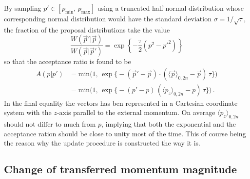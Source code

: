 By sampling $ p' \in [p_\text{min}, \, p_\text{max}] $ using a truncated half-normal distribution whose corresponding normal distribution would have the standard deviation $ \sigma = 1/\sqrt \tau $, the fraction of the proposal distributions take the value
\begin{equation}
	\frac{W(\vec p' | \vec p)}{W(\vec p | \vec p')} = \exp \left\{ - \frac{\tau}{2} (p^2 - p'^2) \right\}
\end{equation}
so that the acceptance ratio is found to be
\begin{equation}
	\begin{split}
		A(p|p')
		&= \text{min} \Big( 1, \, \exp \big\{ - (\vec p' - \vec p) \cdot (\langle \vec p \rangle_{0,2n} - \vec p) \, \tau \big\} \Big) \\
		&= \text{min} \Big( 1, \, \exp \big\{ - (p' - p) \, (\langle p_z \rangle_{0,2n} - p) \, \tau \big\} \Big) \,.
	\end{split}
\end{equation}
In the final equality the vectors has ben represented in a Cartesian coordinate system with the $ z $-axis parallel to the external momentum. On average $ \langle p_z \rangle_{0,2n} $ should not differ to much from $ p $, implying that both the exponential and the acceptance ration should be close to unity most of the time. This of course being the reason why the update procedure is constructed the way it is.


\subsection*{Change of transferred momentum magnitude}

